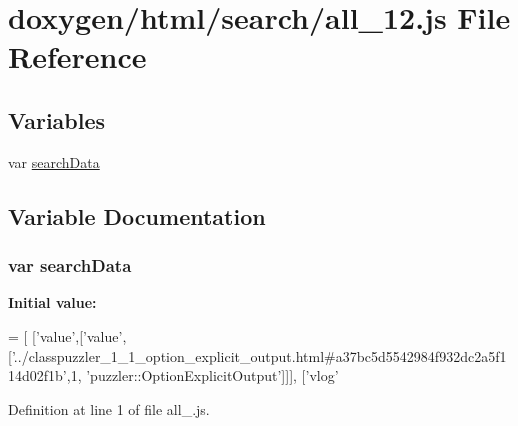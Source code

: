 \hypertarget{a00044}{}\section{doxygen/html/search/all\+\_\+12.js File Reference}
\label{a00044}
\subsection*{Variables}
\begin{DoxyCompactItemize}
\item 
var \hyperlink{a00044_ad01a7523f103d6242ef9b0451861231e}{search\+Data}
\end{DoxyCompactItemize}


\subsection{Variable Documentation}
\hypertarget{a00044_ad01a7523f103d6242ef9b0451861231e}{}
\subsubsection[{search\+Data}]{\setlength{\rightskip}{0pt plus 5cm}var search\+Data}\label{a00044_ad01a7523f103d6242ef9b0451861231e}
{\bfseries Initial value\+:}
\begin{DoxyCode}
=
[
  [\textcolor{stringliteral}{'value'},[\textcolor{stringliteral}{'value'},[\textcolor{stringliteral}{'../classpuzzler\_1\_1\_option\_explicit\_output.html#a37bc5d5542984f932dc2a5f114d02f1b'},1,\textcolor{stringliteral}{
      'puzzler::OptionExplicitOutput'}]]],
  [\textcolor{stringliteral}{'vlog'}
\end{DoxyCode}


Definition at line 1 of file all\+\_.\+js.

